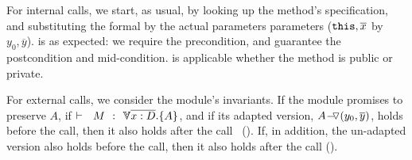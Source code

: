 For  internal calls, we  start, as usual,  by looking up the method's specification, and 
{substituting the formal  by the actual parameters parameters ($\prg{this}, \overline{x}$  by $y_0,\overline{y}$).} %
  {} is as expected:   we  require the precondition, and guarantee the postcondition and mid-condition.
 {} %
 {is} applicable whether the method is public or private.


For external calls, %
we consider the module's invariants. 
If the module promises to preserve $A$, \ie if  $\promises M   {\TwoStatesN {\overline {x:D}} {A}}$, {and  if its adapted version, $ \PushASLong {(y_0, \overline y)}{A}$},  holds before the call, then it also holds after  the call \ ({}).
{If, in addition, the un-adapted version also holds before the call, then it also holds after the call  ({}).}



\vspace{.1cm}

